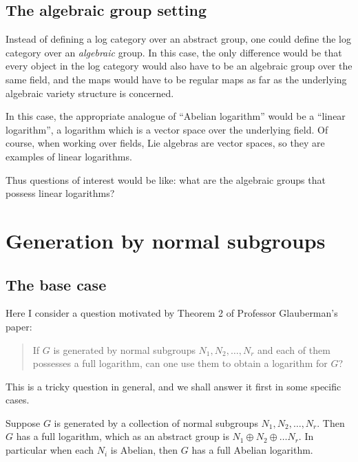 \documentclass[a4paper]{amsart}
\begin{document}
\subsection{The algebraic group setting}

Instead of defining a log category over an abstract group, one could
define the log category over an {\em algebraic} group. In this case,
the only difference would be that every object in the log category
would also have to be an algebraic group over the same field, and the
maps would have to be regular maps as far as the underlying algebraic
variety structure is concerned.

In this case, the appropriate analogue of ``Abelian logarithm'' would
be a ``linear logarithm'', a logarithm which is a vector space over
the underlying field. Of course, when working over fields, Lie
algebras are vector spaces, so they are examples of linear logarithms.

Thus questions of interest would be like: what are the algebraic groups
that possess linear logarithms?

\section{Generation by normal subgroups}

\subsection{The base case}

Here I consider a question motivated by Theorem 2 of Professor
Glauberman's paper:

\begin{quote}
  If $G$ is generated by normal subgroups $N_1, N_2, \ldots, N_r$ and
  each of them possesses a full logarithm, can one use them to obtain a
  logarithm for $G$?
\end{quote}

This is a tricky question in general, and we shall answer it first in
some specific cases.

\begin{theorem}
  Suppose $G$ is generated by a collection of normal subgroups $N_1,
  N_2, \ldots, N_r$. Then $G$ has a full logarithm, which as an
  abstract group is $N_1 \oplus N_2 \oplus \ldots N_r$. In particular
  when each $N_i$ is Abelian, then $G$ has a full Abelian logarithm.
\end{theorem}
\end{document}
